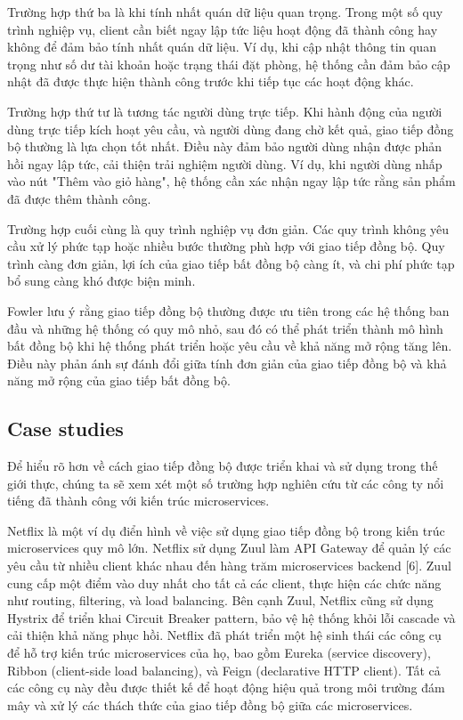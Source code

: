 Trường hợp thứ ba là khi tính nhất quán dữ liệu quan trọng. Trong một số quy trình nghiệp vụ, client cần biết ngay lập tức liệu hoạt động đã thành công hay không để đảm bảo tính nhất quán dữ liệu. Ví dụ, khi cập nhật thông tin quan trọng như số dư tài khoản hoặc trạng thái đặt phòng, hệ thống cần đảm bảo cập nhật đã được thực hiện thành công trước khi tiếp tục các hoạt động khác.

Trường hợp thứ tư là tương tác người dùng trực tiếp. Khi hành động của người dùng trực tiếp kích hoạt yêu cầu, và người dùng đang chờ kết quả, giao tiếp đồng bộ thường là lựa chọn tốt nhất. Điều này đảm bảo người dùng nhận được phản hồi ngay lập tức, cải thiện trải nghiệm người dùng. Ví dụ, khi người dùng nhấp vào nút "Thêm vào giỏ hàng", hệ thống cần xác nhận ngay lập tức rằng sản phẩm đã được thêm thành công.

Trường hợp cuối cùng là quy trình nghiệp vụ đơn giản. Các quy trình không yêu cầu xử lý phức tạp hoặc nhiều bước thường phù hợp với giao tiếp đồng bộ. Quy trình càng đơn giản, lợi ích của giao tiếp bất đồng bộ càng ít, và chi phí phức tạp bổ sung càng khó được biện minh.

Fowler \cite{fowler2014} lưu ý rằng giao tiếp đồng bộ thường được ưu tiên trong các hệ thống ban đầu và những hệ thống có quy mô nhỏ, sau đó có thể phát triển thành mô hình bất đồng bộ khi hệ thống phát triển hoặc yêu cầu về khả năng mở rộng tăng lên. Điều này phản ánh sự đánh đổi giữa tính đơn giản của giao tiếp đồng bộ và khả năng mở rộng của giao tiếp bất đồng bộ.

\subsection{Case studies}
Để hiểu rõ hơn về cách giao tiếp đồng bộ được triển khai và sử dụng trong thế giới thực, chúng ta sẽ xem xét một số trường hợp nghiên cứu từ các công ty nổi tiếng đã thành công với kiến trúc microservices.

Netflix là một ví dụ điển hình về việc sử dụng giao tiếp đồng bộ trong kiến trúc microservices quy mô lớn. Netflix sử dụng Zuul làm API Gateway để quản lý các yêu cầu từ nhiều client khác nhau đến hàng trăm microservices backend [6]. Zuul cung cấp một điểm vào duy nhất cho tất cả các client, thực hiện các chức năng như routing, filtering, và load balancing. Bên cạnh Zuul, Netflix cũng sử dụng Hystrix để triển khai Circuit Breaker pattern, bảo vệ hệ thống khỏi lỗi cascade và cải thiện khả năng phục hồi. Netflix đã phát triển một hệ sinh thái các công cụ để hỗ trợ kiến trúc microservices của họ, bao gồm Eureka (service discovery), Ribbon (client-side load balancing), và Feign (declarative HTTP client). Tất cả các công cụ này đều được thiết kế để hoạt động hiệu quả trong môi trường đám mây và xử lý các thách thức của giao tiếp đồng bộ giữa các microservices.

